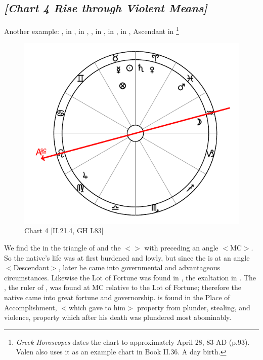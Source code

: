 \subsection*{\textit{[Chart 4 Rise through Violent Means]}}

Another example: \Sun, \Mercury\xspace in \Taurus, \Moon\xspace in \Aquarius, \Saturn, \Venus\xspace in \Aries, \Jupiter\xspace in \Virgo, \Mars\xspace in \Pisces, Ascendant in \Leo
\footnote{\textit{Greek Horoscopes} dates the chart to approximately April 28, 83 AD (p.93). Valen also uses it as an example chart in Book II.36. A day birth.}

\clearpage
\begin{figure}
\centering
\vspace{-20pt}
\includegraphics[width=.68\textwidth]{charts/2_21_4}
\caption{Chart 4 [II.21.4, GH L83]}
\label{fig:chart04}
\end{figure}

We find the \Sun\xspace in the triangle of \Venus\xspace and the \Moon\xspace $<$\Taurus\xspace \Virgo\xspace \Capricorn$>$ with \Venus\xspace preceding an angle $<$MC$>$. So the native’s life was at first burdened and lowly, but since the \Moon\xspace is at an angle $<$Descendant$>$, later he came into governmental and advantageous circumstances. Likewise the Lot of Fortune was found in \Taurus, the exaltation in \Cancer. The \Moon, the ruler of \Cancer, was found at MC relative to the Lot of Fortune; therefore the native came into great fortune and governorship. \Mars\xspace is found in the Place of Accomplishment, $<$which gave to him$>$ property from plunder, stealing, and violence, property which after his death was plundered most abominably.
\newpage
